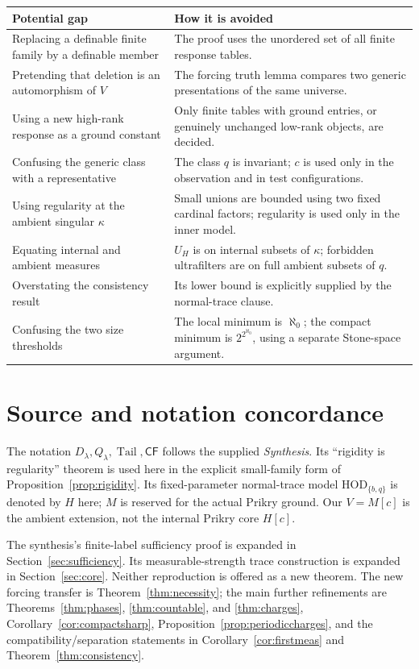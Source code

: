 \documentclass[11pt,letterpaper]{article}
\theoremstyle{definition}
\numberwithin{equation}{section}
\newcommand{\HOD}{\mathrm{HOD}}
\newcommand{\CF}{\mathsf{CF}}
\newcommand{\tail}{\operatorname{Tail}}
\begin{document}
\begin{center}
\small
\renewcommand{\arraystretch}{1.15}
\begin{tabularx}{\textwidth}{@{}P{.33\textwidth}Y@{}}
\toprule
\textbf{Potential gap}&\textbf{How it is avoided}\\
\midrule
Replacing a definable finite family by a definable member&The proof uses the unordered set of all finite response tables.\\
Pretending that deletion is an automorphism of $V$&The forcing truth lemma compares two generic presentations of the same universe.\\
Using a new high-rank response as a ground constant&Only finite tables with ground entries, or genuinely unchanged low-rank objects, are decided.\\
Confusing the generic class with a representative&The class $q$ is invariant; $c$ is used only in the observation and in test configurations.\\
Using regularity at the ambient singular $\kappa$&Small unions are bounded using two fixed cardinal factors; regularity is used only in the inner model.\\
Equating internal and ambient measures&$U_H$ is on internal subsets of $\kappa$; forbidden ultrafilters are on full ambient subsets of $q$.\\
Overstating the consistency result&Its lower bound is explicitly supplied by the normal-trace clause.\\
Confusing the two size thresholds&The local minimum is $\aleph_0$; the compact minimum is $2^{2^{\aleph_0}}$, using a separate Stone-space argument.\\
\bottomrule
\end{tabularx}
\end{center}

\section{Source and notation concordance}\label{app:concordance}

The notation $D_\lambda,Q_\lambda,\tail,\CF$ follows the supplied
\emph{Synthesis}. Its ``rigidity is regularity'' theorem is used here in
the explicit small-family form of Proposition~\ref{prop:rigidity}.
Its fixed-parameter normal-trace model $\HOD_{\{b,q\}}$ is denoted by
$H$ here; $M$ is reserved for the actual Prikry ground. Our $V=M[c]$ is
the ambient extension, not the internal Prikry core $H[c]$.

The synthesis's finite-label sufficiency proof is expanded in
Section~\ref{sec:sufficiency}. Its measurable-strength trace construction
is expanded in Section~\ref{sec:core}. Neither reproduction is offered
as a new theorem. The new forcing transfer is
Theorem~\ref{thm:necessity}; the main further refinements are
Theorems~\ref{thm:phases}, \ref{thm:countable}, and \ref{thm:charges},
Corollary~\ref{cor:compactsharp}, Proposition~\ref{prop:periodiccharges},
and the compatibility/separation
statements in Corollary~\ref{cor:firstmeas} and
Theorem~\ref{thm:consistency}.
\end{document}
